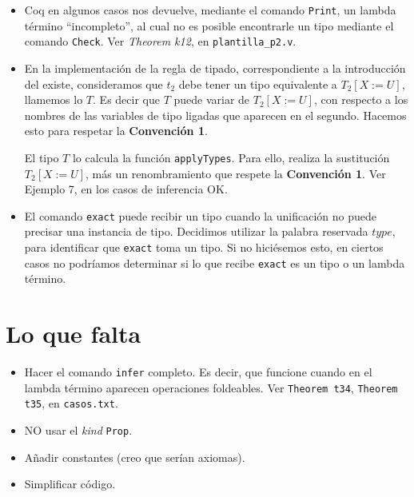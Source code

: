 \documentclass[a4paper,11pt]{article}
\begin{document}
\begin{itemize}
  \item Coq en algunos casos nos devuelve, mediante el comando \texttt{Print}, un lambda término ``incompleto'', al cual no es posible encontrarle
  un tipo mediante el comando \texttt{Check}. Ver \textit{Theorem k12}, en \texttt{plantilla\_p2.v}.
  
  \item En la implementación de la regla de tipado, correspondiente a la introducción del existe, consideramos que $t_{2}$ debe tener un tipo equivalente
  a $T_{2}[X:=U]$, llamemos lo $T$. Es decir que $T$ puede variar de $T_{2}[X:=U]$, con respecto a los nombres de las variables de tipo ligadas que aparecen en 
  el segundo.
  Hacemos esto para respetar la \textbf{Convención 1}. 
  
  El tipo $T$ lo calcula la función \texttt{applyTypes}. Para ello, realiza la sustitución $T_{2}[X:=U]$, más un renombramiento que respete la \textbf{Convención 1}.
  Ver Ejemplo 7, en los casos de inferencia OK.
  
  \item El comando \texttt{exact} puede recibir un tipo cuando la unificación no puede precisar
  una instancia de tipo.
  Decidimos utilizar la palabra reservada $type$, para identificar que \texttt{exact} toma un tipo.
  Si no hiciésemos esto, en ciertos casos no podríamos determinar si lo que recibe \texttt{exact} es un
  tipo o un lambda término.
  

\end{itemize}

\section{Lo que falta}
\begin{itemize}
  \item Hacer el comando \texttt{infer} completo. Es decir, que funcione cuando en el lambda término aparecen operaciones foldeables.
  Ver \texttt{Theorem t34}, \texttt{Theorem t35}, en \texttt{casos.txt}.
  
  \item NO usar el \textit{kind} \texttt{Prop}.
  
  \item Añadir constantes (creo que serían axiomas).
  
  \item Simplificar código.
\end{itemize}
\end{document}
